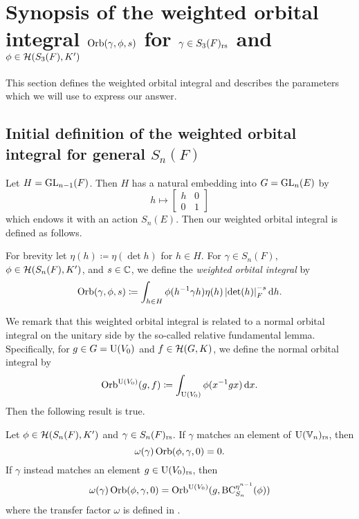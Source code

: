 \chapter{Synopsis of the weighted orbital integral $\operatorname{Orb}(\gamma, \phi, s)$ for $\gamma \in S_3(F)_{\mathrm{rs}}$ and $\phi \in \mathcal H(S_3(F), K')$}
\label{ch:orbital0}

This section defines the weighted orbital integral
and describes the parameters which we will use to express our answer.

\section{Initial definition of the weighted orbital integral for general $S_n(F)$}
Let $H = \operatorname{GL}_{n-1}(F)$.
Then $H$ has a natural embedding into $G = \operatorname{GL}_n(E)$ by
\[ h \mapsto \begin{bmatrix} h & 0 \\ 0 & 1 \end{bmatrix} \]
which endows it with an action $S_n(E)$.
Then our weighted orbital integral is defined as follows.
\begin{definition}
  For brevity let $\eta(h) \coloneqq \eta(\det h)$ for $h \in H$.
  For $\gamma \in S_n(F)$, $\phi \in \mathcal H(S_n(F), K')$, and $s \in \mathbb C$,
  we define the \emph{weighted orbital integral} by
  \[ \Orb(\gamma, \phi, s) \coloneqq
    \int_{h \in H} \phi(h\inv \gamma h) \eta(h)
    \left\lvert \det(h) \right\rvert_F^{-s} \odif h. \]
  \label{def:orbital0}
\end{definition}

We remark that this weighted orbital integral is related to
a normal orbital integral on the unitary side
by the so-called relative fundamental lemma.
Specifically, for $g \in G = \operatorname{U}(V_0)$ and $f \in \mathcal H(G,K)$,
we define the normal orbital integral by
\[ \Orb^{\U(V_0)}(g, f) \coloneqq \int_{\U(V_0)} \phi(x^{-1}gx) \odif x. \]
Then the following result is true.
\begin{theorem}
  \label{thm:rel_fundamental_lemma}
  Let $\phi \in \mathcal H(S_n(F), K')$ and $\gamma \in S_n(F)_{\mathrm{rs}}$.
  If $\gamma$ matches an element of $\operatorname{U}(\mathbb V_n)_{\mathrm{rs}}$, then
  \[ \omega(\gamma) \operatorname{Orb}(\phi, \gamma, 0) = 0. \]
  If $\gamma$ instead matches an element $g \in \operatorname{U}(V_0)_{\mathrm{rs}}$, then
  \[ \omega(\gamma) \operatorname{Orb}(\phi, \gamma, 0)
    = \operatorname{Orb}^{\operatorname{U}(V_0)}(g, \operatorname{BC}^{\eta^{n-1}}_{S_n}(\phi)) \]
  where the transfer factor $\omega$ is defined in .
\end{theorem}

